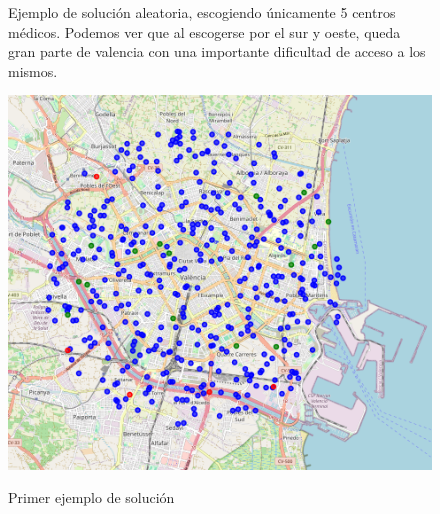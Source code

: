 \documentclass[12pt,a4paper]{book}
\begin{document}
\begin{figure}[htbp]
    \centering
    \begin{minipage}[c]{0.45\textwidth}
        Ejemplo de solución aleatoria, escogiendo únicamente 5 centros médicos. Podemos ver que al escogerse por el sur y oeste, queda gran parte de valencia con una importante dificultad de acceso a los mismos.
    \end{minipage}
    \hfill
    \begin{minipage}[c]{0.45\textwidth}
        \includegraphics[width=\textwidth]{images/solucion_ejemplo_1.png}
        \label{fig:ejemplo_1}
    \end{minipage}
    \caption{Primer ejemplo de solución}
\end{figure}
\end{document}
